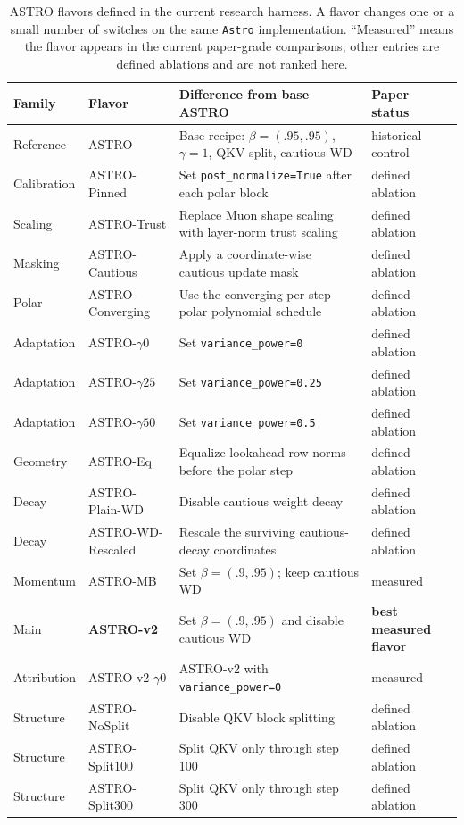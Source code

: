 \documentclass[10pt,twocolumn]{article}
\begin{document}
\begin{table}[t]
\centering
\caption{ASTRO flavors defined in the current research harness. A flavor changes
one or a small number of switches on the same \texttt{Astro} implementation.
``Measured'' means the flavor appears in the current paper-grade comparisons;
other entries are defined ablations and are not ranked here.}
\label{tab:flavors}
\scriptsize
\begin{tabularx}{\textwidth}{@{}l l X l@{}}
\toprule
Family & Flavor & Difference from base ASTRO & Paper status \\
\midrule
Reference & ASTRO & Base recipe: $\beta=(.95,.95)$, $\gamma=1$, QKV split, cautious WD & historical control \\
Calibration & ASTRO-Pinned & Set \texttt{post\_normalize=True} after each polar block & defined ablation \\
Scaling & ASTRO-Trust & Replace Muon shape scaling with layer-norm trust scaling & defined ablation \\
Masking & ASTRO-Cautious & Apply a coordinate-wise cautious update mask & defined ablation \\
Polar & ASTRO-Converging & Use the converging per-step polar polynomial schedule & defined ablation \\
Adaptation & ASTRO-$\gamma0$ & Set \texttt{variance\_power=0} & defined ablation \\
Adaptation & ASTRO-$\gamma25$ & Set \texttt{variance\_power=0.25} & defined ablation \\
Adaptation & ASTRO-$\gamma50$ & Set \texttt{variance\_power=0.5} & defined ablation \\
Geometry & ASTRO-Eq & Equalize lookahead row norms before the polar step & defined ablation \\
Decay & ASTRO-Plain-WD & Disable cautious weight decay & defined ablation \\
Decay & ASTRO-WD-Rescaled & Rescale the surviving cautious-decay coordinates & defined ablation \\
Momentum & ASTRO-MB & Set $\beta=(.9,.95)$; keep cautious WD & measured \\
Main & \textbf{ASTRO-v2} & Set $\beta=(.9,.95)$ and disable cautious WD & \textbf{best measured flavor} \\
Attribution & ASTRO-v2-$\gamma0$ & ASTRO-v2 with \texttt{variance\_power=0} & measured \\
Structure & ASTRO-NoSplit & Disable QKV block splitting & defined ablation \\
Structure & ASTRO-Split100 & Split QKV only through step 100 & defined ablation \\
Structure & ASTRO-Split300 & Split QKV only through step 300 & defined ablation \\
\bottomrule
\end{tabularx}
\end{table}
\end{document}
